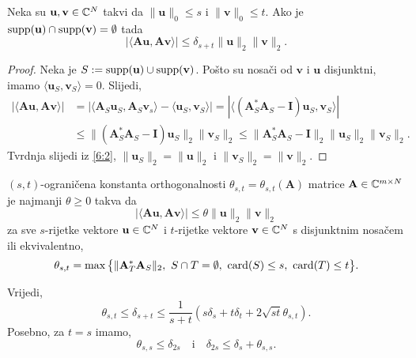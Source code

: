 \documentclass[a4paper,twoside,12pt]{memoir} %
\newcommand{\vect}[1]{\mathbf{#1}}
\renewcommand{\vec}{\vect}
\newcommand{\card}{\text{\normalfont{card}}}
\newcommand{\supp}{\text{\normalfont{supp}}}
\newcommand{\norm}[1]{\|{#1}\|}
\begin{document}
\begin{prop}\label{prop:6:3}
    Neka su $\vec u, \vec v \in \C^N$ takvi da $\norm{\vec u}_0 \leq s$ i $\norm{\vec v}_0 \leq t$. Ako je $\supp(\vec u ) \cap \supp(\vec v) = \emptyset$ tada
    \begin{equation}\label{6:3}
        |\langle \vec{Au}, \vec{Av} \rangle| \leq \delta_{s+t} \norm{\vec u}_2 \norm{\vec v}_2.
    \end{equation}
\end{prop}
\begin{proof}
    Neka je $S:=\supp(\vec u) \cup \supp(\vec v)$. Po\v{s}to su nosa\v{c}i od $\vec v$ i $\vec u $ disjunktni, imamo $\langle \vec u_S, \vec v_S \rangle = 0$. Slijedi,
    \begin{align*}
        |\langle \vec{Au}, \vec{Av} \rangle| &= |\langle \vec A_S \vec u_S, \vec A_S \vec v_s  \rangle - \langle \vec u_S, \vec v_S \rangle| = |\langle (\vec A^*_S \vec A_S - \vec I)\vec u_S, \vec v_S \rangle| \\[1em]
        &\leq \norm{(\vec A^*_S \vec A_S - \vec I) \vec u_S}_2 \norm{\vec v_S}_2 \leq \norm{\vec A^*_S \vec A_S - \vec I}_2 \norm{\vec u_S}_2 \norm{\vec v_S}_2.
    \end{align*}
    Tvrdnja slijedi iz \eqref{6:2}, $\norm{\vec u_S}_2 = \norm{\vec u}_2$ i $\norm{\vec v_S}_2 = \norm{\vec v}_2$.
\end{proof}
\begin{defn}
    $(s,t)$-ograni\v{c}ena konstanta orthogonalnosti $\theta_{s,t} = \theta_{s,t}(\vec A)$ matrice $\vec A \in \C^{m \times N}$ je najmanji $\theta \geq 0$ takva da
    \begin{equation}\label{6:4}
        |\langle \vec{Au}, \vec{Av} \rangle| \leq \theta \norm{\vec u}_2 \norm{\vec v}_2
    \end{equation}
    za sve $s$-rijetke vektore $\vec u \in \C^N$ i $t$-rijetke vektore $\vec v \in \C^N$ s disjunktnim nosa\v{c}em ili ekvivalentno, 
    \begin{equation}\label{6:5}
        \theta_{s, t} = \max \big\{ \norm{\vec A^*_T \vec A_S}_2,\ S \cap T = \emptyset,\ \card(S) \leq s,\ \card(T) \leq t \big\} .
    \end{equation}
\end{defn}
\begin{prop}\label{prop:6:5}
    Vrijedi, 
    \begin{equation*}
        \theta_{s,t} \leq \delta_{s+t} \leq \frac{1}{s+t} (s \delta_s + t\delta_t + 2 \sqrt{st} \theta_{s,t}).
    \end{equation*}
    Posebno, za $t = s$ imamo,
    \begin{equation*}
        \theta_{s,s} \leq \delta_{2s} \quad \text{i} \quad \delta_{2s} \leq \delta_s + \theta_{s,s}.
    \end{equation*}
\end{prop}
\end{document}
